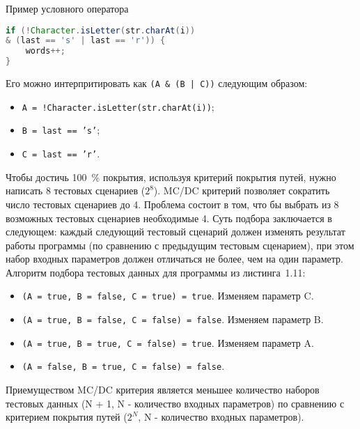 \begin{ListingEnv}[!h]%
	\captiondelim{ } %
	\caption{Пример условного оператора}
	\begin{lstlisting}[language={Java}]
if (!Character.isLetter(str.charAt(i)) 
& (last == 's' | last == 'r')) {
	words++;
}
	\end{lstlisting}
\end{ListingEnv}%

Его можно интерпритировать как \texttt{(A \& (B | C))} следующим образом:

\begin{itemize}
	\item \texttt{A = !Character.isLetter(str.charAt(i))};
	\item \texttt{B = last == 's'};
	\item\texttt{C = last == 'r'}.
\end{itemize}

Чтобы достичь 100~\% покрытия, используя критерий покрытия путей, нужно написать 8 тестовых сценариев (\(2^8\)). MC/DC критерий позволяет сократить число тестовых сценариев до 4. Проблема состоит в том, что бы выбрать из 8 возможных тестовых сценариев необходимые 4. Суть подбора заключается в следующем:  каждый следующий тестовый сценарий должен изменять результат работы программы (по сравнению с предыдущим тестовым сценарием), при этом набор входных параметров должен отличаться не более, чем на один параметр.  Алгоритм подбора тестовых данных для программы из листинга~1.11: 

\begin{itemize}
	\item \texttt{(A = true, B = false, C = true) = true}. Изменяем параметр C.
	\item \texttt{(A = true, B = false, C = false) = false}. Изменяем параметр B.
	\item \texttt{(A = true, B = true, C = false) = true}. Изменяем параметр A.
	\item \texttt{(A = false, B = true, C = false) = false}.
\end{itemize}

Приемуществом MC/DC критерия является меньшее количество наборов тестовых данных (N + 1, N - количество входных параметров) по сравнению с критерием покрытия путей (\(2^N\), N - количество входных параметров).


